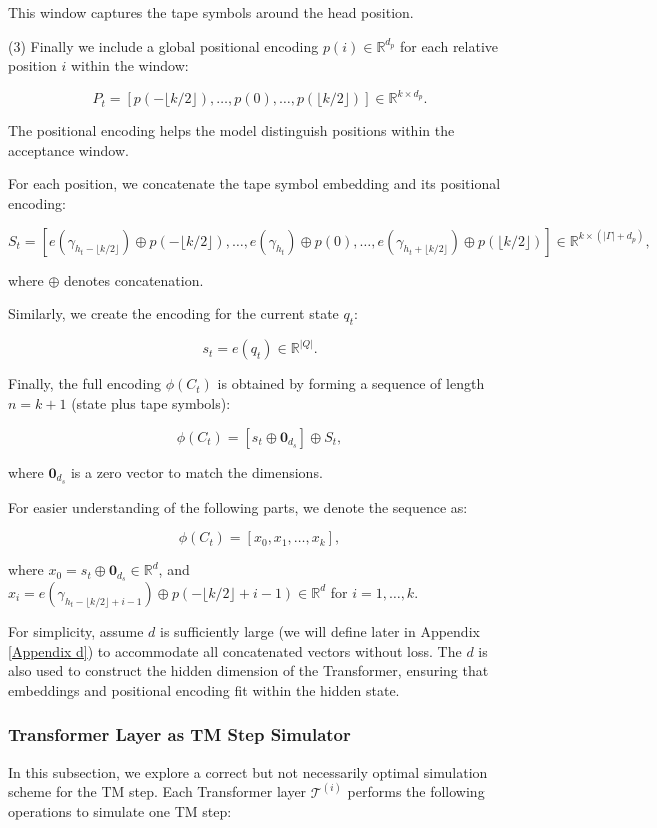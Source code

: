 {This window captures the tape symbols around the head position.

(3) Finally we include a global positional encoding \( p(i) \in \mathbb{R}^{d_p} \) for each relative position \( i \) within the window:

\[
P_t = \left[ p(-\lfloor k/2 \rfloor), \dots, p(0), \dots, p(\lfloor k/2 \rfloor) \right] \in \mathbb{R}^{k \times d_p}.
\]

The positional encoding helps the model distinguish positions within the acceptance window.

For each position, we concatenate the tape symbol embedding and its positional encoding:

\[
S_t = \left[ e(\gamma_{h_t - \lfloor k/2 \rfloor}) \oplus p(-\lfloor k/2 \rfloor), \dots, e(\gamma_{h_t}) \oplus p(0), \dots, e(\gamma_{h_t + \lfloor k/2 \rfloor}) \oplus p(\lfloor k/2 \rfloor) \right] \in \mathbb{R}^{k \times (|\Gamma| + d_p)},
\]

where \( \oplus \) denotes concatenation.

Similarly, we create the encoding for the current state \( q_t \):

\[
s_t = e(q_t) \in \mathbb{R}^{|Q|}.
\]

Finally, the full encoding \( \phi(C_t) \) is obtained by forming a sequence of length \( n = k + 1 \) (state plus tape symbols):

\[
\phi(C_t) = \left[ s_t \oplus \mathbf{0}_{d_s} \right] \oplus S_t,
\]

where \( \mathbf{0}_{d_s} \) is a zero vector to match the dimensions.

For easier understanding of the following parts, we denote the sequence as:

\[
\phi(C_t) = \left[ x_0, x_1, \dots, x_k \right],
\]

where \( x_0 = s_t \oplus \mathbf{0}_{d_s} \in \mathbb{R}^{d} \), and \( x_i = e(\gamma_{h_t - \lfloor k/2 \rfloor + i -1}) \oplus p(-\lfloor k/2 \rfloor + i -1) \in \mathbb{R}^{d} \) for \( i = 1, \dots, k \).

 For simplicity, assume \( d \) is sufficiently large (we will define later in Appendix \ref{Appendix d}) to accommodate all concatenated vectors without loss. The \(d\) is also used to construct the hidden dimension of the Transformer, ensuring that embeddings and positional encoding fit within the hidden state.

\subsubsection{Transformer Layer as TM Step Simulator}
In this subsection, we explore a correct but not necessarily optimal simulation scheme for the TM step.
Each Transformer layer \( \mathcal{T}^{(i)} \) performs the following operations to simulate one TM step:


}
